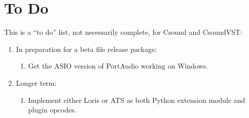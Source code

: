 \documentclass[10pt,letterpaper,onecolumn]{ltxguide}
\begin{document}
\section{To Do}

This is a ``to do'' list, not necessarily complete, for Csound and CsoundVST:

\begin{enumerate}
\item In preparation for a beta file release package:
\begin{enumerate}
\item Get the ASIO version of PortAudio working on Windows.
\end{enumerate}
\item Longer term:
\begin{enumerate}
\item Implement either Loris or ATS as both Python extension module and plugin opcodes.
\end{enumerate}
\end{enumerate}
\end{document}
